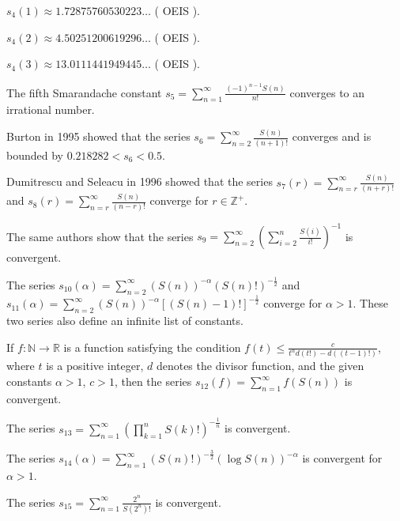 \documentclass[12pt]{article}
\begin{document}
$s_4(1) \approx 1.72875760530223 \ldots$ ( OEIS ).

$s_4(2) \approx 4.50251200619296 \ldots$ ( OEIS ).

$s_4(3) \approx 13.0111441949445 \ldots$ ( OEIS ).

The fifth Smarandache constant $\displaystyle s_5=\sum_{n=1}^{\infty}\frac{(-1)^{n-1}S(n)}{n!}$ converges to an irrational number.

Burton in 1995 showed that the series $\displaystyle s_6=\sum_{n=2}^{\infty}\frac{S(n)}{(n+1)!}$ converges and is bounded by $0.218282<s_{6}<0.5$.

Dumitrescu and Seleacu in 1996 showed that the series $\displaystyle s_7(r)=\sum_{n=r}^{\infty}\frac{S(n)}{(n+r)!}$ and $\displaystyle s_8(r)=\sum_{n=r}^{\infty}\frac{S(n)}{(n-r)!}$ converge for $r \in \mathbb{Z}^+ $.

The same authors show that the series $\displaystyle s_9=\sum_{n=2}^{\infty}\left(\sum_{i=2}^{n}\frac{S(i)}{i!}\right)^{-1}$ is convergent.

The series $\displaystyle s_{10}(\alpha)=\sum_{n=2}^{\infty} \left(S(n) \right)^{-\alpha} \left(S(n)!\right)^{-\frac{1}{2}}$ and $\displaystyle s_{11}(\alpha)=\sum_{n=2}^{\infty}\left(S(n)\right)^{-\alpha}\left[\left(S(n)-1\right)!\right]^{-\frac{1}{2}}$ converge for $\alpha > 1$. These two series also define an infinite list of constants.

If $f:\mathbb{N} \rightarrow \mathbb{R}$ is a function satisfying the condition $\displaystyle f(t) \leq \frac{c}{t^{\alpha}d\left(t!\right)-d\left((t-1)!\right)}$, where $t$ is a positive integer, $d$ denotes the divisor function, and the given constants $\alpha >1$, $c>1$, then the series $\displaystyle s_{12}(f)= \sum_{n=1}^{\infty}f\left(S(n)\right)$ is convergent.

The series $\displaystyle s_{13}=\sum_{n=1}^{\infty} \left(\prod_{k=1}^{n}S(k)!\right)^{-\frac{1}{n}}$ is convergent.

The series $\displaystyle s_{14}(\alpha)=\sum_{n=1}^{\infty}\left(S(n)!\right)^{-\frac{3}{2}}\left(\log{S(n)}\right)^{-\alpha}$ is convergent for $\alpha>1$.

The series $\displaystyle s_{15}=\sum_{n=1}^{\infty}\frac{2^n}{S(2^{n})!}$ is convergent.
\end{document}
